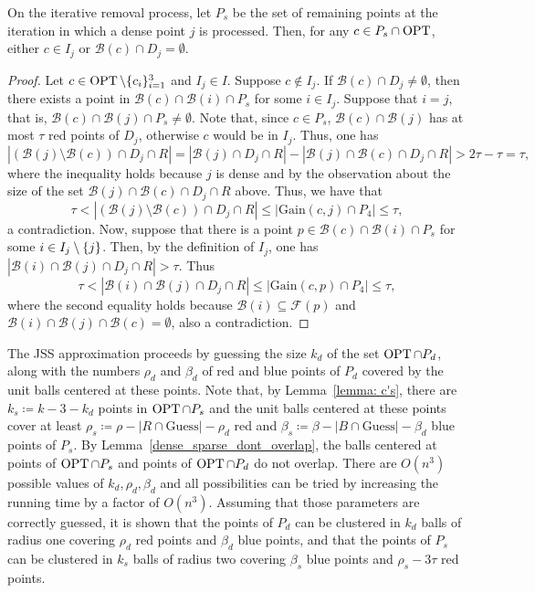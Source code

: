 \begin{lemma}
    \label{dense_sparse_dont_overlap}
    On the iterative removal process, let $P_s$ be the set of remaining points at the iteration in which a dense point $j$ is processed. Then, for any $c \in P_s \cap \operatorname{OPT}$, either $c \in I_j$ or $\mathcal{B}(c) \cap D_j = \emptyset$.
\end{lemma}
\begin{proof}
Let $c \in \operatorname{OPT} \setminus \{c_i\}_{i=1}^3$ and $I_j \in I$. 
Suppose $c \not \in I_j$. 
If $\mathcal{B}(c) \cap D_j \neq \emptyset$, then there exists a point in $\mathcal{B}(c) \cap \mathcal{B}(i) \cap P_s$ for some $i \in I_j$. 
Suppose that $i=j$, that is, $\mathcal{B}(c) \cap \mathcal{B}(j) \cap P_s \neq \emptyset$. Note that, since $c \in P_s$, $\mathcal{B}(c) \cap \mathcal{B}(j)$ has at most $\tau$ red points of $D_j$, otherwise $c$ would be in $I_j$. Thus, one has
\[
|(\mathcal{B}(j) \setminus \mathcal{B}(c)) \cap D_j \cap R| = |\mathcal{B}(j) \cap D_j \cap R| - |\mathcal{B}(j) \cap \mathcal{B}(c) \cap D_j \cap R| > 2 \tau - \tau = \tau,
\]
where the inequality holds because $j$ is dense and by the observation about the size of the set $\mathcal{B}(j) \cap \mathcal{B}(c) \cap D_j \cap R$ above. Thus, we have that 
\[\tau < |(\mathcal{B}(j) \setminus \mathcal{B}(c)) \cap D_j \cap R| \leq |\mathrm{Gain}(c,j) \cap P_4| \leq \tau,\]
a contradiction. Now, suppose that there is a point $p \in \mathcal{B}(c) \cap \mathcal{B}(i) \cap P_s$ for some $i \in I_j\setminus \left\{j\right\}$. Then, by the definition of $I_j$, one has ${|\mathcal{B}(i) \cap \mathcal{B}(j) \cap D_j \cap R| > \tau}$. Thus
\[\tau < |\mathcal{B}(i) \cap \mathcal{B}(j) \cap D_j\cap R| \leq |\mathrm{Gain}(c,p) \cap P_4| \leq \tau, \]
where the second equality holds because $\mathcal{B}(i) \subseteq \mathcal{F}(p)$ and $ \mathcal{B}(i) \cap \mathcal{B}(j) \cap \mathcal{B}(c) = \emptyset$, also a contradiction.
\end{proof}
The JSS approximation proceeds by guessing the size $k_d$ of the set $\operatorname{OPT} \cap P_d$, along with the numbers $\rho_d$ and $\beta_d$ of red and blue points of $P_d$ covered by the unit balls centered at these points.
Note that, by Lemma~\ref{lemma: c's}, there are $k_s \coloneqq k - 3 - k_d$ points in $\operatorname{OPT} \cap P_s$ and the unit balls centered at these points cover at least $\rho_s \coloneqq \rho - |R \cap \mathrm{Guess}| - \rho_d$ red and $\beta_s \coloneqq \beta - |B \cap \mathrm{Guess}| - \beta_d$ blue points of $P_s$. 
By Lemma~\ref{dense_sparse_dont_overlap}, the balls centered at points of $\operatorname{OPT} \cap P_s$ and points of $\operatorname{OPT} \cap P_d$ do not overlap.
There are $O(n^3)$ possible values of $k_d,\rho_d,\beta_d$ and all possibilities can be tried by increasing the running time by a factor of $O(n^3)$. 
Assuming that those parameters are correctly guessed, it is shown that the points of $P_d$ can be clustered in $k_d$ balls of radius one covering $\rho_d$ red points and $\beta_d$ blue points, and that the points of $P_s$ can be clustered in $k_s$ balls of radius two covering $\beta_s$ blue points and $\rho_s - 3\tau$ red points.

